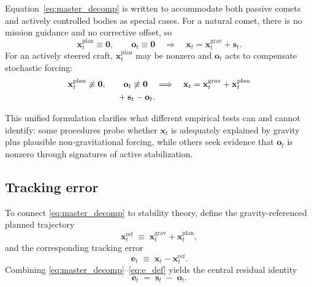 \documentclass{article}
\begin{document}
Equation~\eqref{eq:master_decomp} is written to accommodate both passive comets and actively controlled bodies as special cases. For a natural comet, there is no mission guidance and no corrective offset, so
\begin{equation}
\mathbf{x}^{\mathrm{plan}}_t \equiv \mathbf{0},\qquad \mathbf{o}_t \equiv \mathbf{0}
\quad\Longrightarrow\quad
\mathbf{x}_t = \mathbf{x}^{\mathrm{grav}}_t + \mathbf{s}_t.
\label{eq:natural_comet}
\end{equation}
For an actively steered craft, $\mathbf{x}^{\mathrm{plan}}_t$ may be nonzero and $\mathbf{o}_t$ acts to compensate stochastic forcing:
\begin{equation}
\begin{aligned}
\mathbf{x}^{\mathrm{plan}}_t &\not\equiv \mathbf{0},\qquad \mathbf{o}_t \not\equiv \mathbf{0}
\quad\Longrightarrow\quad
\mathbf{x}_t
= \mathbf{x}^{\mathrm{grav}}_t + \mathbf{x}^{\mathrm{plan}}_t \\
&\hspace{3.6em} + \mathbf{s}_t - \mathbf{o}_t.
\end{aligned}
\label{eq:controlled_craft}
\end{equation}

This unified formulation clarifies what different empirical tests can and cannot identify: some procedures probe whether $\mathbf{x}_t$ is adequately explained by gravity plus plausible non-gravitational forcing, while others seek evidence that $\mathbf{o}_t$ is nonzero through signatures of active stabilization.

\subsection{Tracking error}

To connect \eqref{eq:master_decomp} to stability theory, define the gravity-referenced planned trajectory
\begin{equation}
\mathbf{x}^{\mathrm{ref}}_t \;\equiv\; \mathbf{x}^{\mathrm{grav}}_t + \mathbf{x}^{\mathrm{plan}}_t,
\label{eq:x_ref_def}
\end{equation}
and the corresponding tracking error
\begin{equation}
\mathbf{e}_t \;\equiv\; \mathbf{x}_t - \mathbf{x}^{\mathrm{ref}}_t.
\label{eq:e_def}
\end{equation}
Combining \eqref{eq:master_decomp}--\eqref{eq:e_def} yields the central residual identity
\begin{equation}
\mathbf{e}_t \;=\; \mathbf{s}_t \;-\; \mathbf{o}_t.
\label{eq:error_shock_offset}
\end{equation}
\end{document}
